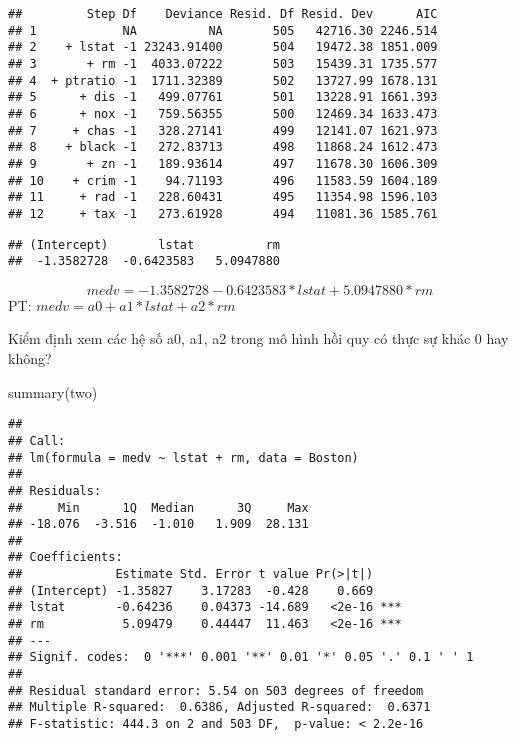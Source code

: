 \documentclass[
]{article}
\newenvironment{Shaded}{\begin{snugshade}}{\end{snugshade}}
\newcommand{\AttributeTok}[1]{\textcolor[rgb]{0.77,0.63,0.00}{#1}}
\newcommand{\FunctionTok}[1]{\textcolor[rgb]{0.00,0.00,0.00}{#1}}
\newcommand{\NormalTok}[1]{#1}
\newcommand{\OtherTok}[1]{\textcolor[rgb]{0.56,0.35,0.01}{#1}}
\newcommand{\SpecialCharTok}[1]{\textcolor[rgb]{0.00,0.00,0.00}{#1}}
\begin{document}
\begin{verbatim}
##         Step Df    Deviance Resid. Df Resid. Dev      AIC
## 1            NA          NA       505   42716.30 2246.514
## 2    + lstat -1 23243.91400       504   19472.38 1851.009
## 3       + rm -1  4033.07222       503   15439.31 1735.577
## 4  + ptratio -1  1711.32389       502   13727.99 1678.131
## 5      + dis -1   499.07761       501   13228.91 1661.393
## 6      + nox -1   759.56355       500   12469.34 1633.473
## 7     + chas -1   328.27141       499   12141.07 1621.973
## 8    + black -1   272.83713       498   11868.24 1612.473
## 9       + zn -1   189.93614       497   11678.30 1606.309
## 10    + crim -1    94.71193       496   11583.59 1604.189
## 11     + rad -1   228.60431       495   11354.98 1596.103
## 12     + tax -1   273.61928       494   11081.36 1585.761
\end{verbatim}

\begin{Shaded}
\end{Shaded}

\begin{verbatim}
## (Intercept)       lstat          rm 
##  -1.3582728  -0.6423583   5.0947880
\end{verbatim}

\[
medv =  -1.3582728  -0.6423583*lstat  + 5.0947880 *rm
\] PT: \(medv = a0 + a1 * lstat + a2*rm\)

Kiểm định xem các hệ số a0, a1, a2 trong mô hình hồi quy có thực sự khác
0 hay không?

\begin{Shaded}
\begin{Highlighting}[]
\FunctionTok{summary}\NormalTok{(two)}
\end{Highlighting}
\end{Shaded}

\begin{verbatim}
## 
## Call:
## lm(formula = medv ~ lstat + rm, data = Boston)
## 
## Residuals:
##     Min      1Q  Median      3Q     Max 
## -18.076  -3.516  -1.010   1.909  28.131 
## 
## Coefficients:
##             Estimate Std. Error t value Pr(>|t|)    
## (Intercept) -1.35827    3.17283  -0.428    0.669    
## lstat       -0.64236    0.04373 -14.689   <2e-16 ***
## rm           5.09479    0.44447  11.463   <2e-16 ***
## ---
## Signif. codes:  0 '***' 0.001 '**' 0.01 '*' 0.05 '.' 0.1 ' ' 1
## 
## Residual standard error: 5.54 on 503 degrees of freedom
## Multiple R-squared:  0.6386, Adjusted R-squared:  0.6371 
## F-statistic: 444.3 on 2 and 503 DF,  p-value: < 2.2e-16
\end{verbatim}
\end{document}
